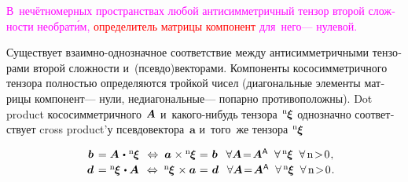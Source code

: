 \begin{otherlanguage}{russian}
\textcolor{magenta}{В~нечётномерных пространствах любой антисимметричный тензор второй сложности необрат\'{и}м,}
\textcolor{red}{определитель матрицы компонент}
\textcolor{magenta}{для~него\:--- нулевой.}

Существует взаимно\hbox{-}однозначное соответствие
между
антисимметричными тензорами
второй сложности
и~(псевдо)векторами.
Компоненты кососимметричного тензора
полностью определяются тройкой чисел
(диагональные элементы матрицы компонент\:--- нули,
недиагональные\:--- попарно противоположны).
Dot product кососимметричного~${\hspace{-0.2ex}\bm{A}}$
и~какого\hbox{-}нибудь тензора~${\hspace{-0.2ex}{^\mathrm{n}\hspace{-0.12ex}\bm{\xi}}}$
однозначно соответствует cross product’у псевдовектора~$\bm{a}$
и~того~же тензора~${\hspace{-0.2ex}{^\mathrm{n}\hspace{-0.12ex}\bm{\xi}}}$

\nopagebreak\vspace{-0.1em}\begin{equation}\begin{array}{c}
\hspace{1.2em} \bm{b} \hspace{.3ex}
= \bm{A} \hspace{.2ex}\dotp\hspace{.1ex} {^\mathrm{n}\hspace{-0.12ex}\bm{\xi}}
\;\,\Leftrightarrow\;
\bm{a} \hspace{.1ex} \times {^\mathrm{n}\hspace{-0.12ex}\bm{\xi}}
\hspace{.1ex} = \hspace{.15ex} \bm{b} \hspace{.1ex} \;\:\:
\forall \bm{A} \!=\! \bm{A}^{\mathsf{\!\,A}} \;\;
\forall \, {^\mathrm{n}\hspace{-0.12ex}\bm{\xi}} \;\; \forall \,\mathrm{n \!>\! 0}
\hspace{.15ex} ,
\\[.2em]
%
\hspace{1.2em} \bm{d} \hspace{.3ex}
= {^\mathrm{n}\hspace{-0.12ex}\bm{\xi}} \hspace{.2ex} \dotp \bm{A}
\;\,\Leftrightarrow\;
{^\mathrm{n}\hspace{-0.12ex}\bm{\xi}} \hspace{.2ex}\times \bm{a}
\hspace{.1ex} = \hspace{.15ex} \bm{d} \hspace{.1ex} \;\:\:
\forall \bm{A} \!=\! \bm{A}^{\mathsf{\!\,A}} \;\;
\forall \, {^\mathrm{n}\hspace{-0.12ex}\bm{\xi}} \;\; \forall \,\mathrm{n \!>\! 0}
\hspace{.15ex} .
\end{array}\end{equation}


\end{otherlanguage}
